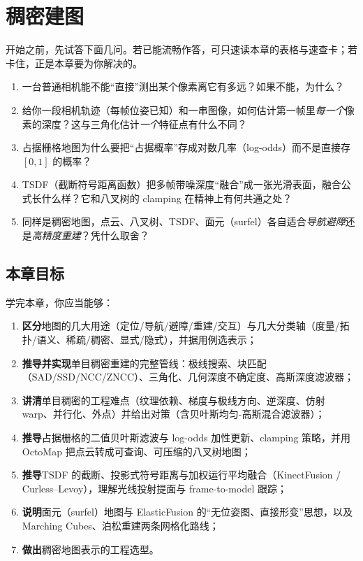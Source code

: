 \chapter{稠密建图}
\label{ch:dense}


\begin{practice}[前置自测]
开始之前，先试答下面几问。若已能流畅作答，可只速读本章的表格与速查卡；若卡住，正是本章要为你解决的。
\begin{enumerate}
  \item 一台普通相机能不能“直接”测出某个像素离它有多远？如果不能，为什么？
  \item 给你一段相机轨迹（每帧位姿已知）和一串图像，如何估计第一帧里\emph{每一个}像素的深度？这与三角化估计\emph{一个}特征点有什么不同？
  \item 占据栅格地图为什么要把“占据概率”存成对数几率（log-odds）而不是直接存 $[0,1]$ 的概率？
  \item TSDF（截断符号距离函数）把多帧带噪深度“融合”成一张光滑表面，融合公式长什么样？它和八叉树的 clamping 在精神上有何共通之处？
  \item 同样是稠密地图，点云、八叉树、TSDF、面元（surfel）各自适合\emph{导航避障}还是\emph{高精度重建}？凭什么取舍？
\end{enumerate}
\end{practice}

\section*{本章目标}
学完本章，你应当能够：
\begin{enumerate}
  \item \textbf{区分}地图的几大用途（定位/导航/避障/重建/交互）与几大分类轴（度量/拓扑/语义、稀疏/稠密、显式/隐式），并据用例选表示；
  \item \textbf{推导并实现}单目稠密重建的完整管线：极线搜索、块匹配（SAD/SSD/NCC/ZNCC）、三角化、几何深度不确定度、高斯深度滤波器；
  \item \textbf{讲清}单目稠密的工程难点（纹理依赖、梯度与极线方向、逆深度、仿射 warp、并行化、外点）并给出对策（含贝叶斯均匀-高斯混合滤波器）；
  \item \textbf{推导}占据栅格的二值贝叶斯滤波与 log-odds 加性更新、clamping 策略，并用 OctoMap 把点云转成可查询、可压缩的八叉树地图；
  \item \textbf{推导}TSDF 的截断、投影式符号距离与加权运行平均融合（KinectFusion / Curless--Levoy），理解光线投射提面与 frame-to-model 跟踪；
  \item \textbf{说明}面元（surfel）地图与 ElasticFusion 的“无位姿图、直接形变”思想，以及 Marching Cubes、泊松重建两条网格化路线；
  \item \textbf{做出}稠密地图表示的工程选型。
\end{enumerate}

